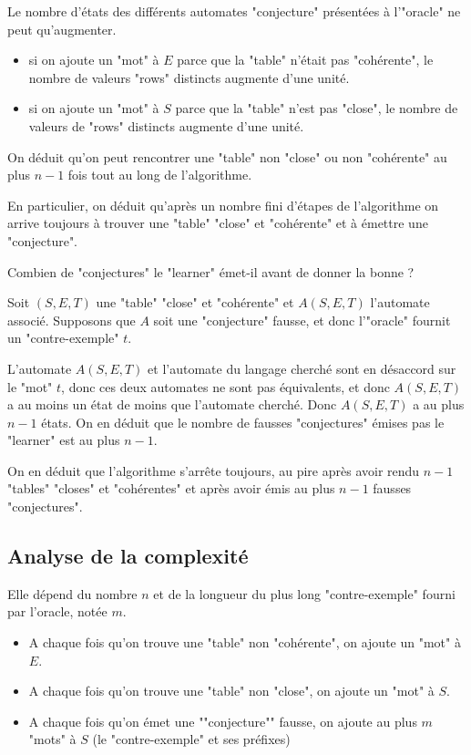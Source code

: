 \begin{remarque}
	Le nombre d'états des différents automates "conjecture" présentées à l'"oracle" ne peut qu'augmenter.
	\begin{itemize}
		\item si on ajoute un "mot" à $E$ parce que la "table" n'était pas "cohérente", le nombre de valeurs "rows" distincts augmente
		      d'une unité.
		\item si on ajoute un "mot" à $S$ parce que la "table" n'est pas "close", le nombre de valeurs de "rows" distincts augmente d'une unité.
	\end{itemize}
	On déduit qu'on peut rencontrer une "table" non "close" ou non "cohérente" au plus $n-1$ fois tout au long de l'algorithme.

	En particulier, on déduit qu'après un nombre fini d'étapes de l'algorithme on arrive toujours à trouver
	une "table" "close" et "cohérente" et à émettre une "conjecture".
\end{remarque}


Combien de "conjectures" le "learner" émet-il avant de donner la bonne ?

Soit $(S,E,T)$ une "table" "close" et "cohérente" et $A(S,E,T)$ l'automate associé.
Supposons que $A$ soit une "conjecture" fausse, et donc l'"oracle" fournit un "contre-exemple" $t$.

L'automate $A(S,E,T)$ et l'automate du langage cherché sont en désaccord sur le "mot" $t$, donc ces deux automates
ne sont pas équivalents, et donc $A(S,E,T)$ a au moins un état de moins que l'automate cherché.
Donc $A(S,E,T)$ a au plus $n-1$ états. On en déduit que le nombre de fausses "conjectures" émises pas le "learner" est au plus $n-1$.

On en déduit que l'algorithme s'arrête toujours, au pire après avoir rendu $n-1$ "tables" "closes" et
"cohérentes" et après avoir émis au plus $n-1$ fausses "conjectures".


\subsection{Analyse de la complexité}

Elle dépend du nombre $n$ et de la longueur du plus long "contre-exemple" fourni par l'oracle, notée $m$.


\begin{itemize}
	\item A chaque fois qu'on trouve une "table" non "cohérente", on ajoute un "mot" à $E$.
	\item A chaque fois qu'on trouve une "table" non "close", on ajoute un "mot" à $S$.
	\item A chaque fois qu'on émet une ""conjecture"" fausse, on ajoute au plus $m$ "mots" à $S$ (le "contre-exemple" et ses préfixes)
\end{itemize}

